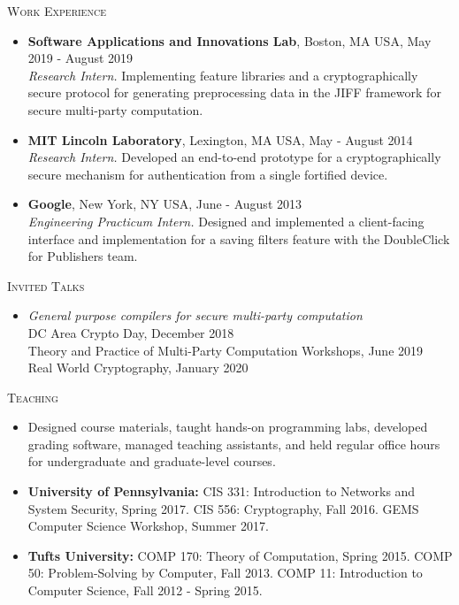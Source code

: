 \documentclass{article}
\begin{document}
\textsc{Work Experience}
\begin{itemize}[label={}]
  \item \textbf{Software Applications and Innovations Lab}, Boston, MA USA, May 2019 - August 2019\\
  \textit{Research Intern.} Implementing feature libraries and a cryptographically secure protocol for generating preprocessing data in the JIFF framework for secure multi-party computation.
  \item \textbf{MIT Lincoln Laboratory}, Lexington, MA USA, May - August 2014 \\
  \textit{Research Intern.} Developed an end-to-end prototype for a cryptographically secure mechanism for authentication from a single fortified device.
  \item \textbf{Google}, New York, NY USA, June - August 2013\\
  \textit{Engineering Practicum Intern.} Designed and implemented a client-facing interface and implementation for a saving filters feature with the DoubleClick for Publishers team.
\end{itemize}

\textsc{Invited Talks}
\begin{itemize}[label={}]
\item \emph{General purpose compilers for secure multi-party computation}\\
  DC Area Crypto Day, December 2018 \\
  Theory and Practice of Multi-Party Computation Workshops, June 2019\\
  Real World Cryptography, January 2020
\end{itemize}

\textsc{Teaching}
\begin{itemize}[label={}]
\item Designed course materials, taught hands-on programming labs, developed grading software, managed teaching assistants, and held regular office hours for undergraduate and graduate-level courses.

\item \textbf{University of Pennsylvania:}
CIS 331: Introduction to Networks and System Security, Spring 2017.
CIS 556: Cryptography, Fall 2016.
GEMS Computer Science Workshop, Summer 2017.
\item \textbf{Tufts University:} 
COMP 170: Theory of Computation, Spring 2015.
COMP 50: Problem-Solving by Computer, Fall 2013.
COMP 11: Introduction to Computer Science, Fall 2012 - Spring 2015.
\end{itemize}
\end{document}
